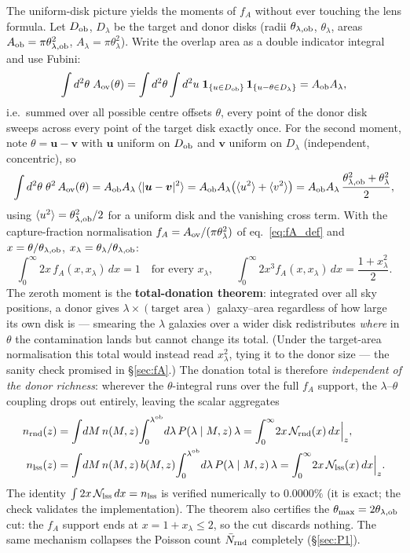 \documentclass[a4paper, 11pt]{article}
\newcommand{\lob}{\lambda^{\rm ob}}
\newcommand{\avg}[1]{\langle #1 \rangle}
\newcommand{\nlss}{n_{\rm lss}}
\newcommand{\nrnd}{n_{\rm rnd}}
\newcommand{\Ncal}{\mathcal{N}}
\newcommand{\Nbar}{\bar{N}_{\rm rnd}}
\newcommand{\thob}{\theta_{\lambda,{\rm ob}}}
\begin{document}
The uniform-disk picture yields the moments of $f_A$ without ever
touching the lens formula. Let $D_{\rm ob}$, $D_\lambda$ be the
target and donor disks (radii $\thob$, $\theta_\lambda$, areas
$A_{\rm ob}=\pi\thob^2$, $A_\lambda=\pi\theta_\lambda^2$). Write
the overlap area as a double indicator integral and use Fubini:
\begin{equation}
\int d^2\theta\; A_{\rm ov}(\theta)
= \int d^2\theta \int d^2u\;
\mathbf{1}_{\{u\in D_{\rm ob}\}}\,\mathbf{1}_{\{u-\theta\in D_\lambda\}}
= A_{\rm ob}A_\lambda,
\end{equation}
i.e.\ summed over all possible centre offsets $\theta$, every
point of the donor disk sweeps across every point of the target
disk exactly once. For the second moment, note
$\theta=\bm{u}-\bm{v}$ with $\bm{u}$ uniform on $D_{\rm ob}$ and
$\bm{v}$ uniform on $D_\lambda$ (independent, concentric), so
\begin{equation}
\int d^2\theta\; \theta^2\, A_{\rm ov}(\theta)
= A_{\rm ob}A_\lambda\,\avg{|\bm{u}-\bm{v}|^2}
= A_{\rm ob}A_\lambda\big(\avg{u^2}+\avg{v^2}\big)
= A_{\rm ob}A_\lambda\,\frac{\thob^2+\theta_\lambda^2}{2},
\end{equation}
using $\avg{u^2}=\thob^2/2$ for a uniform disk and the vanishing
cross term. With the capture-fraction normalisation
$f_A = A_{\rm ov}/(\pi\theta_\lambda^2)$ of eq.~\eqref{eq:fA_def}
and $x=\theta/\thob$, $x_\lambda=\theta_\lambda/\thob$:
\begin{equation}
\boxed{\;
\int_0^\infty 2x\,f_A(x,x_\lambda)\,dx = 1
\quad\text{for every } x_\lambda,
\qquad
\int_0^\infty 2x^3 f_A(x,x_\lambda)\,dx = \frac{1+x_\lambda^2}{2}.
\;}
\label{eq:moments}
\end{equation}
The zeroth moment is the \textbf{total-donation theorem}:
integrated over all sky positions, a donor gives
$\lambda\times(\text{target area})$ galaxy--area regardless of how
large its own disk is --- smearing the $\lambda$ galaxies over a
wider disk redistributes \emph{where} in $\theta$ the
contamination lands but cannot change its total. (Under the
target-area normalisation this total would instead read
$x_\lambda^2$, tying it to the donor size --- the sanity check
promised in \S\ref{sec:fA}.) The donation total is therefore
\emph{independent of the donor richness}: wherever the
$\theta$-integral runs over the full $f_A$ support, the
$\lambda$--$\theta$ coupling drops out entirely, leaving the
scalar aggregates
\begin{align}
\nrnd(z) &= \int\!dM\,n(M,z)\!\int_0^{\lob}\!d\lambda\,P(\lambda\mid M,z)\,\lambda
= \int_0^\infty\! 2x\,\Ncal_{\rm rnd}(x)\,dx\Big|_z,
\notag\\
\nlss(z) &= \int\!dM\,n(M,z)\,b(M,z)\!\int_0^{\lob}\!d\lambda\,P(\lambda\mid M,z)\,\lambda
= \int_0^\infty\! 2x\,\Ncal_{\rm lss}(x)\,dx\Big|_z.
\label{eq:blam}
\end{align}
The identity $\int 2x\,\Ncal_{\rm lss}\,dx = \nlss$ is verified
numerically to $0.0000\%$ (it is exact; the check validates the
implementation). The theorem also certifies the
$\theta_{\max}=2\thob$ cut: the $f_A$ support ends at
$x=1+x_\lambda\le2$, so the cut discards nothing. The same
mechanism collapses the Poisson count $\Nbar$ completely
(\S\ref{sec:P1}).
\end{document}
